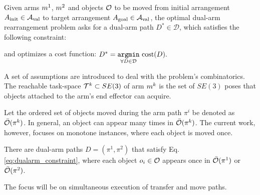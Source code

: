 { Given arms $m^1$, $m^2$ and objects $\mathcal{O}$ to be moved from initial arrangement $ A_{\rm init} \in \mathcal{A}_{\rm val}$ to target arrangement $ A_{\rm goal} \in \mathcal{A}_{\rm val} $, the optimal dual-arm rearrangement problem asks for a dual-arm path $D^* \in \mathcal{D}$, which satisfies the following constraint:

\begin{equation}
\label{eq:dualarm_constraint}
\end{equation}
\noindent and optimizes a cost function: $D^* = \underset{ \forall D \in \mathcal{D}}{ \mathtt{argmin} } \ \textup{cost}(D).$}

A set of assumptions are introduced to deal with the problem's combinatorics. The reachable task-space $\mathcal{T}^k \subset SE(3)$ of arm $m^k$ is the set of $SE(3)$ poses that objects attached to the arm's end effector can acquire.


Let the ordered set of objects moved during the arm path $ \pi^i $ be denoted as $ \bar{\mathcal{O}}(\pi^k) $. In general, an object can appear many times in $ \bar{\mathcal{O}}(\pi^k) $. The current work, however, focuses on monotone instances, where each object is moved once.

{\assumption [Monotonicity] There are dual-arm paths $D = (\pi^1,\pi^2)$ that satisfy Eq. \ref{eq:dualarm_constraint}, where each object $ o_i \in \mathcal{O} $ appears once in $\bar{\mathcal{O}}(\pi^1)$ or $ \bar{\mathcal{O}}(\pi^2)$.}

The focus will be on simultaneous execution of transfer and move paths. 

